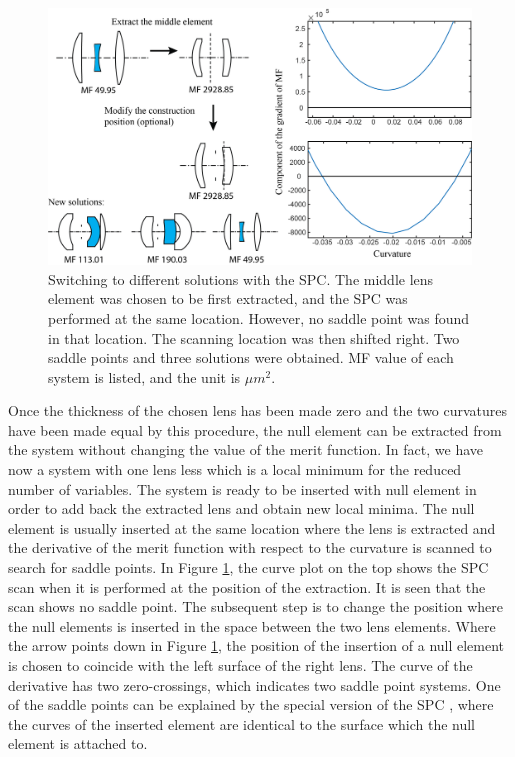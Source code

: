 \begin{figure}[h!]
    \centering
    \includegraphics[scale=0.68]{chapter-2/figures/spc_switch.png}
    \caption{Switching to different solutions with the SPC. The middle lens element was chosen to be first extracted, and the SPC was performed at the same location. However, no saddle point was found in that location. The scanning location was then shifted right. Two saddle points and three solutions were obtained. MF value of each system is listed, and the unit is $\mu m^2$. }
    \label{fig:SPC-switch-example}
\end{figure}

Once the thickness of the chosen lens has been made zero and the two curvatures have been made equal by this procedure, the null element can be extracted from the system without changing the value of the merit function. In fact, we have now a system with one lens less which is a local minimum for the reduced number of variables. The system is ready to be inserted with null element in order to add back the extracted lens and obtain new local minima. The null element is usually inserted at the same location where the lens is extracted and the derivative of the merit function with respect to the curvature is scanned to search for saddle points. In Figure \ref{fig:SPC-switch-example}, the curve plot on the top shows the SPC scan when it is performed at the position of the extraction. It is seen that the scan shows no saddle point. The subsequent step is to change the position where the null elements is inserted in the space between the two lens elements. Where the arrow points down in Figure \ref{fig:SPC-switch-example}, the position of the insertion of a null element is chosen to coincide with the left surface of the right lens. The curve of the derivative has two zero-crossings, which indicates two saddle point systems. One of the saddle points can be explained by the special version of the SPC \cite{BociortSPCSexplained}, where the curves of the inserted element are identical to the surface which the null element is attached to. 

